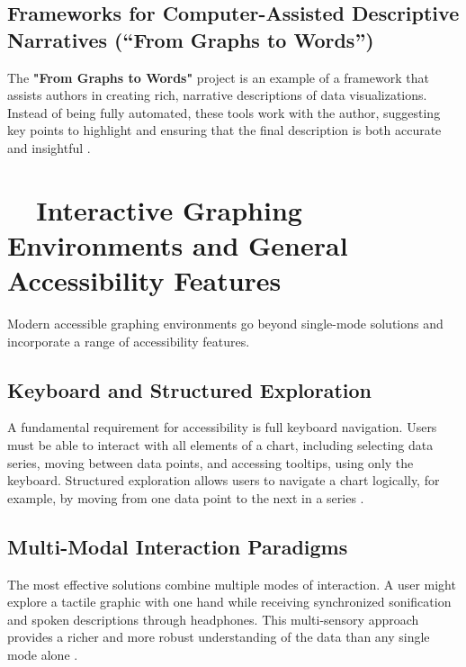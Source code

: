 \subsection{Frameworks for Computer-Assisted Descriptive Narratives (``From Graphs to Words'')}\label{ch13:ssec:descriptive-narratives}
The \textbf{"From Graphs to Words"} project is an example of a framework that assists authors in creating rich, narrative descriptions of data visualizations. Instead of being fully automated, these tools work with the author, suggesting key points to highlight and ensuring that the final description is both accurate and insightful \supercite{FromGraphsToWords}.

\section{~~Interactive Graphing Environments and General Accessibility Features}\label{ch13:sec:interactive-environments}
Modern accessible graphing environments go beyond single-mode solutions and incorporate a range of accessibility features.

\subsection{Keyboard  and Structured Exploration}\label{ch13:ssec:keyboard-navigation}
A fundamental requirement for accessibility is full keyboard navigation. Users must be able to interact with all elements of a chart, including selecting data series, moving between data points, and accessing tooltips, using only the keyboard. Structured exploration allows users to navigate a chart logically, for example, by moving from one data point to the next in a series \supercite{AutoVizuA11y}.

\subsection{Multi-Modal Interaction Paradigms}\label{ch13:ssec:multi-modal}
The most effective solutions combine multiple modes of interaction. A user might explore a tactile graphic with one hand while receiving synchronized sonification and spoken descriptions through headphones. This multi-sensory approach provides a richer and more robust understanding of the data than any single mode alone \supercite{RichScreenReaderExperiences, ReindersAccessibleData}.

